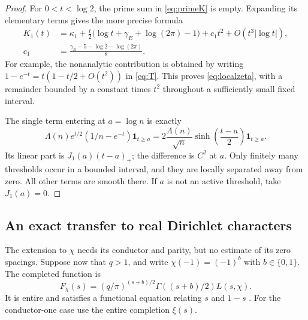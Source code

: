 \documentclass[11pt]{article}
\theoremstyle{definition}
\newcommand{\gE}{\gamma_{\!E}}
\newcommand{\kap}{\kappa}
\begin{document}
\begin{proof}
For $0<t<\log2$, the prime sum in \cref{eq:primeK} is empty. Expanding its
elementary terms gives the more precise formula
\begin{align*}
 K_1(t)&=\kap_1+\frac t2\bigl(\log t+\gE+\log(2\pi)-1\bigr)
       +c_1t^2+O(t^3|\log t|),\\
 c_1&=\frac{\gE-5-\log2-\log(2\pi)}8.
\end{align*}
For example, the nonanalytic contribution is obtained by writing
$1-e^{-t}=t(1-t/2+O(t^2))$ in \cref{eq:T}. This proves
\cref{eq:localzeta}, with a remainder bounded by a constant times $t^2$
throughout a sufficiently small fixed interval.

The single term entering at $a=\log n$ is exactly
\begin{equation}\label{eq:sinhcusp}
 \Lambda(n)e^{t/2}(1/n-e^{-t})\mathbf1_{t\ge a}
 =2\frac{\Lambda(n)}{\sqrt n}\sinh\left(\frac{t-a}2\right)\mathbf1_{t\ge a}.
\end{equation}
Its linear part is $J_1(a)(t-a)_+$; the difference is $C^2$ at $a$.
Only finitely many thresholds occur in a bounded interval, and they are locally
separated away from zero. All other terms are smooth there. If $a$ is not an
active threshold, take $J_1(a)=0$.
\end{proof}

\subsection{An exact transfer to real Dirichlet characters}

The extension to $\chi$ needs its conductor and parity, but no estimate of its
zero spacings. Suppose now that $q>1$, and write $\chi(-1)=(-1)^b$ with
$b\in\{0,1\}$. The completed function is
\[
 F_\chi(s)=(q/\pi)^{(s+b)/2}\Gamma((s+b)/2)L(s,\chi).
\]
It is entire and satisfies a functional equation relating $s$ and $1-s$
\cite{dlmf}.
For the conductor-one case use the entire completion $\xi(s)$.
\end{document}
